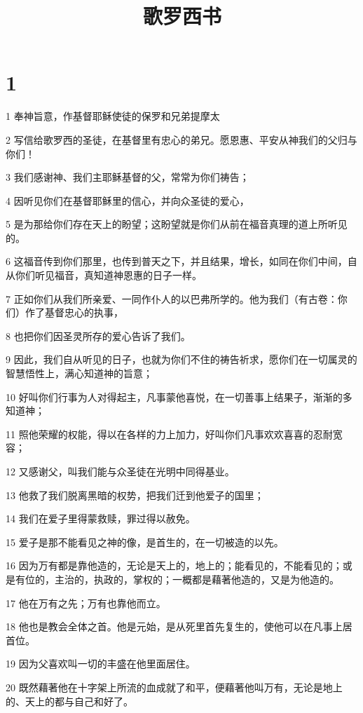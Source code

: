 

\title{歌罗西书}


\chapter{1}

\par 1 奉神旨意，作基督耶稣使徒的保罗和兄弟提摩太
\par 2 写信给歌罗西的圣徒，在基督里有忠心的弟兄。愿恩惠、平安从神我们的父归与你们！
\par 3 我们感谢神、我们主耶稣基督的父，常常为你们祷告；
\par 4 因听见你们在基督耶稣里的信心，并向众圣徒的爱心，
\par 5 是为那给你们存在天上的盼望；这盼望就是你们从前在福音真理的道上所听见的。
\par 6 这福音传到你们那里，也传到普天之下，并且结果，增长，如同在你们中间，自从你们听见福音，真知道神恩惠的日子一样。
\par 7 正如你们从我们所亲爱、一同作仆人的以巴弗所学的。他为我们（有古卷：你们）作了基督忠心的执事，
\par 8 也把你们因圣灵所存的爱心告诉了我们。
\par 9 因此，我们自从听见的日子，也就为你们不住的祷告祈求，愿你们在一切属灵的智慧悟性上，满心知道神的旨意；
\par 10 好叫你们行事为人对得起主，凡事蒙他喜悦，在一切善事上结果子，渐渐的多知道神；
\par 11 照他荣耀的权能，得以在各样的力上加力，好叫你们凡事欢欢喜喜的忍耐宽容；
\par 12 又感谢父，叫我们能与众圣徒在光明中同得基业。
\par 13 他救了我们脱离黑暗的权势，把我们迁到他爱子的国里；
\par 14 我们在爱子里得蒙救赎，罪过得以赦免。
\par 15 爱子是那不能看见之神的像，是首生的，在一切被造的以先。
\par 16 因为万有都是靠他造的，无论是天上的，地上的；能看见的，不能看见的；或是有位的，主治的，执政的，掌权的；一概都是藉著他造的，又是为他造的。
\par 17 他在万有之先；万有也靠他而立。
\par 18 他也是教会全体之首。他是元始，是从死里首先复生的，使他可以在凡事上居首位。
\par 19 因为父喜欢叫一切的丰盛在他里面居住。
\par 20 既然藉著他在十字架上所流的血成就了和平，便藉著他叫万有，无论是地上的、天上的都与自己和好了。
